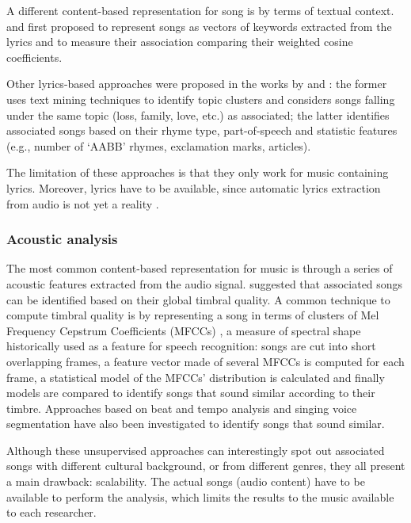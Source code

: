 A different content-based representation for song is by terms of textual context.
\citet{Kaji05} and \citet{Mahedero05} first proposed to represent songs as vectors of keywords extracted from the lyrics and to measure their association comparing their weighted cosine coefficients.

Other lyrics-based approaches were proposed in the works by \citet{Kleedorfer08} and \citet{Mayer08}:
the former uses text mining techniques to identify topic clusters and considers songs falling under the same topic (loss, family, love, etc.) as associated;
the latter identifies associated songs based on their rhyme type, part-of-speech and statistic features (e.g., number of `AABB' rhymes, exclamation marks, articles).

The limitation of these approaches is that they only work for music containing lyrics.
Moreover, lyrics have to be available, since automatic lyrics extraction from audio is not yet a reality \cite{Berenzweig01}.

\subsubsection{Acoustic analysis} %
\label{ssub:acoustic_analysis}

The most common content-based representation for music is through a series of acoustic features extracted from the audio signal.
\citet{Aucouturier02b} suggested that associated songs can be identified based on their global timbral quality.
A common technique to compute timbral quality is by representing a song in terms of clusters of Mel Frequency Cepstrum Coefficients (MFCCs) \cite{Aucouturier04}, a measure of spectral shape historically used as a feature for speech recognition: songs are cut into short overlapping frames, a feature vector made of several MFCCs is computed for each frame, a statistical model of the MFCCs' distribution is calculated and finally models are compared to identify songs that sound similar according to their timbre.
%
%
Approaches based on beat and tempo analysis \cite{Tzanetakis02} and singing voice segmentation \cite{Berenzweig02} have also been investigated to identify songs that sound similar.

Although these unsupervised approaches can interestingly spot out associated songs with different cultural background, or from different genres, they all present a main drawback: scalability.
The actual songs (audio content) have to be available to perform the analysis, which limits the results to the music available to each researcher.

